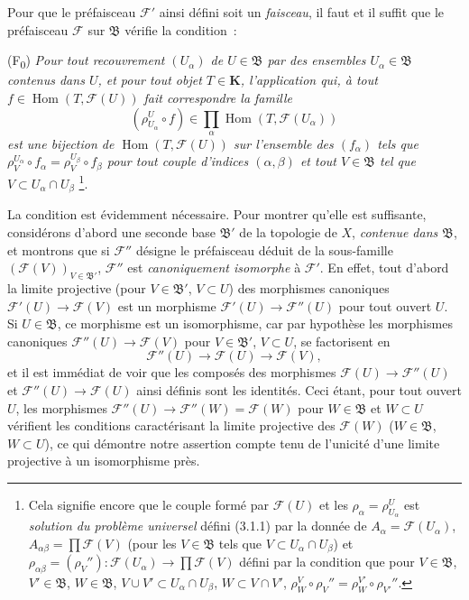 \begin{env}[3.2.2]
\label{0.3.2.2-fr}
Pour que le préfaisceau $\mathcal{F}'$ ainsi défini soit un \emph{faisceau},
il faut et il suffit que le préfaisceau $\mathcal{F}$ sur $\mathfrak{B}$
vérifie la condition~:

\smallskip
\noindent
\textup{(F\textsubscript{0})} \emph{Pour tout recouvrement $(U_\alpha)$ de
$U\in\mathfrak{B}$ par des ensembles $U_\alpha\in\mathfrak{B}$ contenus dans
$U$, et pour tout objet $T\in\mathbf{K}$, l'application qui, à tout
$f\in\operatorname{Hom}(T,\mathcal{F}(U))$ fait correspondre la famille
\[
  (\rho_{U_\alpha}^{U}\circ f)
  \in\prod_\alpha\operatorname{Hom}(T,\mathcal{F}(U_\alpha))
\]
est une bijection de $\operatorname{Hom}(T,\mathcal{F}(U))$ sur l'ensemble des
$(f_\alpha)$ tels que
$\rho_V^{U_\alpha}\circ f_\alpha=\rho_V^{U_\beta}\circ f_\beta$ pour tout
couple d'indices $(\alpha,\beta)$ et tout $V\in\mathfrak{B}$ tel que
$V\subset U_\alpha\cap U_\beta$}%
\footnote{Cela signifie encore que le couple formé par $\mathcal{F}(U)$ et les
$\rho_\alpha=\rho_{U_\alpha}^{U}$ est \emph{solution du problème universel}
défini (3.1.1) par la donnée de
$A_\alpha=\mathcal{F}(U_\alpha)$,
$A_{\alpha\beta}=\prod\mathcal{F}(V)$ (pour les $V\in\mathfrak{B}$ tels que
$V\subset U_\alpha\cap U_\beta$) et
$\rho_{\alpha\beta}=(\rho_V''):\mathcal{F}(U_\alpha)\to
\prod\mathcal{F}(V)$ défini par la condition que pour
$V\in\mathfrak{B}$, $V'\in\mathfrak{B}$, $W\in\mathfrak{B}$,
$V\cup V'\subset U_\alpha\cap U_\beta$, $W\subset V\cap V'$,
$\rho_W^V\circ\rho_V''=\rho_W^{V'}\circ\rho_{V'}''$.}.

La condition est évidemment nécessaire. Pour montrer qu'elle est suffisante,
considérons d'abord une seconde base $\mathfrak{B}'$ de la topologie de $X$,
\emph{contenue dans $\mathfrak{B}$}, et montrons que si $\mathcal{F}''$
désigne le préfaisceau déduit de la sous-famille
$(\mathcal{F}(V))_{V\in\mathfrak{B}'}$, $\mathcal{F}''$ est
\emph{canoniquement isomorphe} à $\mathcal{F}'$. En effet, tout d'abord la
limite projective (pour $V\in\mathfrak{B}'$, $V\subset U$) des morphismes
canoniques $\mathcal{F}'(U)\to\mathcal{F}(V)$ est un morphisme
$\mathcal{F}'(U)\to\mathcal{F}''(U)$ pour tout ouvert $U$. Si
$U\in\mathfrak{B}$, ce morphisme est un isomorphisme, car par hypothèse les
morphismes canoniques $\mathcal{F}''(U)\to\mathcal{F}(V)$ pour
$V\in\mathfrak{B}'$, $V\subset U$, se factorisent en
\[
  \mathcal{F}''(U)\to\mathcal{F}(U)\to\mathcal{F}(V),
\]
et il est immédiat de voir que les composés des morphismes
$\mathcal{F}(U)\to\mathcal{F}''(U)$ et
$\mathcal{F}''(U)\to\mathcal{F}(U)$ ainsi définis sont les identités. Ceci
étant, pour tout ouvert $U$, les morphismes
$\mathcal{F}''(U)\to\mathcal{F}''(W)=\mathcal{F}(W)$ pour
$W\in\mathfrak{B}$ et $W\subset U$ vérifient les conditions caractérisant la
limite projective des $\mathcal{F}(W)$ ($W\in\mathfrak{B}$, $W\subset U$), ce
qui démontre notre assertion compte tenu de l'unicité d'une limite projective
à un isomorphisme près.


\end{env}
